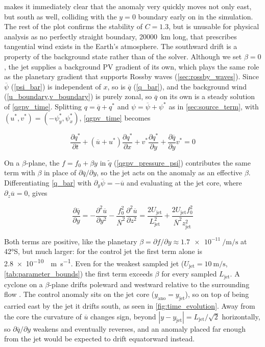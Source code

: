 \documentclass{article}
\begin{document}
 makes it immediately clear that the anomaly very quickly moves not only east, but south as well, colliding with the $y=0$ boundary early on in the simulation.
The rest of the plot confirms the stability of $C=1.3$, but is unusable for physical analysis as no perfectly straight boundary, \qty{20000}{\kilo\meter} long, that prescribes tangential wind exists in the Earth's atmosphere.
The southward drift is a property of the background state rather than of the solver.
Although we set $\beta = 0$, the jet supplies a background PV gradient of its own, which plays the same role as the planetary gradient that supports Rossby waves (\cref{sec:rossby_waves}).
Since $\overline\psi$ (\cref{psi_bar}) is independent of $x$, so is $\overline q$ (\cref{q_bar}), and the background wind (\cref{u_boundary,v_boundary}) is purely zonal, so $\overline q$ on its own is a steady solution of \cref{qgpv_time}.
Splitting $q = \overline q + q^*$ and $\psi = \overline\psi + \psi^*$ as in \cref{sec:source_term}, with $(u^*, v^*) = (-\psi^*_y, \psi^*_x)$, \cref{qgpv_time} becomes

\begin{equation}\label{perturbation_pv}
    \frac{\partial q^*}{\partial t} + \left( \overline u + u^* \right) \frac{\partial q^*}{\partial x} + v^* \frac{\partial q^*}{\partial y} + \frac{\partial \overline q}{\partial y} v^* = 0
\end{equation}

On a $\beta$-plane, the $f = f_0 + \beta y$ in $\tilde q$ (\cref{qgpv_pressure_psi}) contributes the same term with $\beta$ in place of $\partial \overline q / \partial y$, so the jet acts on the anomaly as an effective $\beta$.
Differentiating \cref{q_bar} with $\partial_y \overline\psi = -\overline u$ and evaluating at the jet core, where $\partial_z \overline u = 0$, gives

\begin{equation}\label{beta_eff_core}
    \frac{\partial \overline q}{\partial y} = -\frac{\partial^2 \overline u}{\partial y^2} - \frac{f_0^2}{\overline N^2} \frac{\partial^2 \overline u}{\partial z^2} = \frac{2 U_\text{jet}}{L_\text{jet}^2} + \frac{2 U_\text{jet} f_0^2}{\overline N^2 z_\text{jet}^2}
\end{equation}

Both terms are positive, like the planetary $\beta = \partial f / \partial y \approx \qty{1.7e-11}{\per\meter\per\second}$ at \ang{42}S, but much larger: for the control jet the first term alone is \qty{2.8e-10}{\per\meter\per\second}.
Even for the weakest sampled jet ($U_\text{jet} = \qty{10}{\meter\per\second}$, \cref{tab:parameter_bounds}) the first term exceeds $\beta$ for every sampled $L_\text{jet}$.
A cyclone on a $\beta$-plane drifts poleward and westward relative to the surrounding flow \cite{Holland1983}.
The control anomaly sits on the jet core ($y_\text{ano} = y_\text{jet}$), so on top of being carried east by the jet it drifts south, as seen in \cref{fig:time_evolution}.
Away from the core the curvature of $\overline u$ changes sign, beyond $|y - y_\text{jet}| = L_\text{jet} / \sqrt{2}$ horizontally, so $\partial \overline q / \partial y$ weakens and eventually reverses, and an anomaly placed far enough from the jet would be expected to drift equatorward instead.
\end{document}
